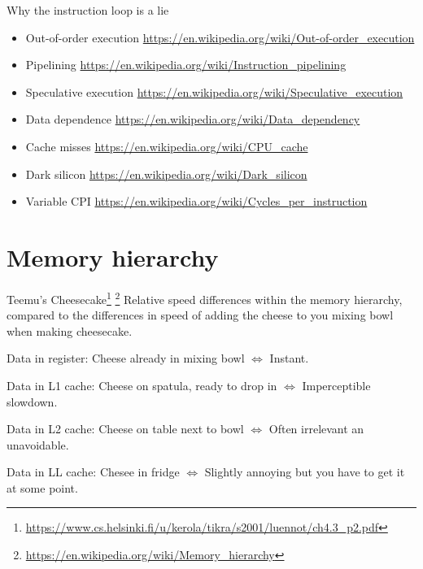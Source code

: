 \documentclass[11pt, aspectratio=169, table]{beamer}
\begin{document}
\begin{frame}{Why the instruction loop is a lie}
\begin{itemize}
\item \alert{Out-of-order execution} \url{https://en.wikipedia.org/wiki/Out-of-order_execution}
\item \alert{Pipelining} \url{https://en.wikipedia.org/wiki/Instruction_pipelining}
\item \alert{Speculative execution} \url{https://en.wikipedia.org/wiki/Speculative_execution}
\item \alert{Data dependence} \url{https://en.wikipedia.org/wiki/Data_dependency}
\item \alert{Cache misses} \url{https://en.wikipedia.org/wiki/CPU_cache}
\item \alert{Dark silicon} \url{https://en.wikipedia.org/wiki/Dark_silicon}
\item \alert{Variable CPI} \url{https://en.wikipedia.org/wiki/Cycles_per_instruction}
\end{itemize}
\end{frame}

\section{Memory hierarchy}
\begin{frame}{Teemu's Cheesecake\footnote{\url{https://www.cs.helsinki.fi/u/kerola/tikra/s2001/luennot/ch4.3_p2.pdf}}
\footnote{\url{https://en.wikipedia.org/wiki/Memory_hierarchy}}}
Relative speed differences within the memory hierarchy, compared to the differences in speed of adding the cheese to you mixing bowl when making cheesecake.

\begin{description}[style=standard,leftmargin=*]
\item{\alert{Data in register: }} Cheese already in mixing bowl $\Leftrightarrow$ Instant.
\item{\alert{Data in L1 cache: }} Cheese on spatula, ready to drop in $\Leftrightarrow$ Imperceptible slowdown.
\item{\alert{Data in L2 cache: }} Cheese on table next to bowl $\Leftrightarrow$ Often irrelevant an unavoidable.
\item{\alert{Data in LL cache: }} Chesee in fridge $\Leftrightarrow$ Slightly annoying but you have to get it at some point.
\end{description}
\end{frame}
\end{document}
